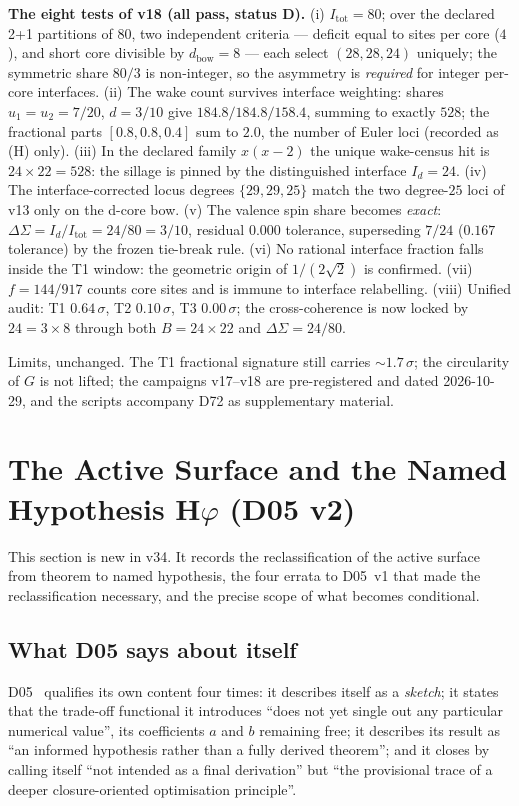 \documentclass[11pt,a4paper]{article}
\theoremstyle{plain}
\theoremstyle{definition}
\theoremstyle{remark}
\begin{document}
\textbf{The eight tests of v18 (all pass, status D).} (i) $I_{\mathrm{tot}}=80$; over the declared 2+1 partitions of $80$, two independent criteria --- deficit equal to sites per core ($4$), and short core divisible by $d_{\mathrm{bow}}=8$ --- each select $(28,28,24)$ uniquely; the symmetric share $80/3$ is non-integer, so the asymmetry is \emph{required} for integer per-core interfaces. (ii) The wake count survives interface weighting: shares $u_{1}=u_{2}=7/20$, $d=3/10$ give $184.8/184.8/158.4$, summing to exactly $528$; the fractional parts $[0.8,0.8,0.4]$ sum to $2.0$, the number of Euler loci (recorded as (H) only). (iii) In the declared family $x(x-2)$ the unique wake-census hit is $24\times22=528$: the sillage is pinned by the distinguished interface $I_{d}=24$. (iv) The interface-corrected locus degrees $\{29,29,25\}$ match the two degree-$25$ loci of v13 only on the d-core bow. (v) The valence spin share becomes \emph{exact}: $\Delta\Sigma=I_{d}/I_{\mathrm{tot}}=24/80=3/10$, residual $0.000$ tolerance, superseding $7/24$ ($0.167$ tolerance) by the frozen tie-break rule. (vi) No rational interface fraction falls inside the T1 window: the geometric origin of $1/(2\sqrt{2})$ is confirmed. (vii) $f=144/917$ counts core sites and is immune to interface relabelling. (viii) Unified audit: T1 $0.64\,\sigma$, T2 $0.10\,\sigma$, T3 $0.00\,\sigma$; the cross-coherence is now locked by $24=3\times8$ through both $B=24\times22$ and $\Delta\Sigma=24/80$.

\textcolor{negativered}{Limits, unchanged.} The T1 fractional signature still carries $\sim1.7\,\sigma$; the circularity of $G$ is not lifted; the campaigns v17--v18 are pre-registered and dated 2026-10-29, and the scripts accompany D72 as supplementary material.

\section{The Active Surface and the Named Hypothesis \texorpdfstring{H$\varphi$}{Hphi} (D05 v2)}
\label{sec:Hphi}

This section is new in v34. It records the reclassification of the active surface from theorem to named hypothesis, the four errata to D05~v1 that made the reclassification necessary, and the precise scope of what becomes conditional.

\subsection{What D05 says about itself}
\label{subsec:D05self}
D05~\cite{D05} qualifies its own content four times: it describes itself as a \emph{sketch}; it states that the trade-off functional it introduces ``does not yet single out any particular numerical value'', its coefficients $a$ and $b$ remaining free; it describes its result as ``an informed hypothesis rather than a fully derived theorem''; and it closes by calling itself ``not intended as a final derivation'' but ``the provisional trace of a deeper closure-oriented optimisation principle''.
\end{document}
